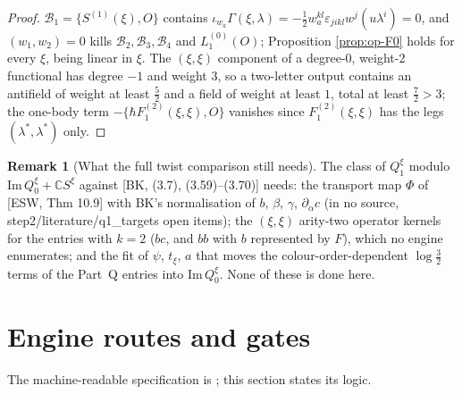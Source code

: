 \documentclass[11pt]{article}
\numberwithin{equation}{section}
\theoremstyle{plain}
\theoremstyle{definition}
\newtheorem{remark}[theorem]{Remark}
\begin{document}
\begin{proof}
$\mathcal B_1=\{S^{(1)}(\xi),O\}$ contains $\iota_{w_a}\Gamma(\xi,\lambda)=-\tfrac12w_a^{kl}\varepsilon_{jikl}w^j(u\lambda^i)=0$, and $(w_1,w_2)=0$ kills $\mathcal B_2,\mathcal B_3,\mathcal B_4$ and $L_1^{(0)}(O)$; Proposition \ref{prop:op-F0} holds for every $\xi$, being linear in $\xi$. The $(\xi,\xi)$ component of a degree-$0$, weight-$2$ functional has degree $-1$ and weight $3$, so a two-letter output contains an antifield of weight at least $\tfrac52$ and a field of weight at least $1$, total at least $\tfrac72>3$; the one-body term $-\{\hbar F_1^{(2)}(\xi,\xi),O\}$ vanishes since $F_1^{(2)}(\xi,\xi)$ has the legs $(\lambda^*,\lambda^*)$ only.
\end{proof}

\begin{remark}[What the full twist comparison still needs]
\label{rem:op-twistopen}
The class of $Q^\xi_1$ modulo $\mathrm{Im}\,Q^\xi_0+\mathbb CS^\xi$ against [BK, (3.7), (3.59)--(3.70)] needs: the transport map $\Phi$ of [ESW, Thm 10.9] with BK's normalisation of $b$, $\beta$, $\gamma$, $\partial_{\dot\alpha}c$ (in no source, step2/literature/q1\_targets open items); the $(\xi,\xi)$ arity-two operator kernels for the entries with $k=2$ ($bc$, and $bb$ with $b$ represented by $F$), which no engine enumerates; and the fit of $\psi$, $t_\xi$, $a$ that moves the colour-order-dependent $\log\tfrac32$ terms of the Part~Q entries into $\mathrm{Im}\,Q^\xi_0$. None of these is done here.
\end{remark}

\section{Engine routes and gates}
\label{sec:op-engines}

The machine-readable specification is ; this section states its logic.
\end{document}
